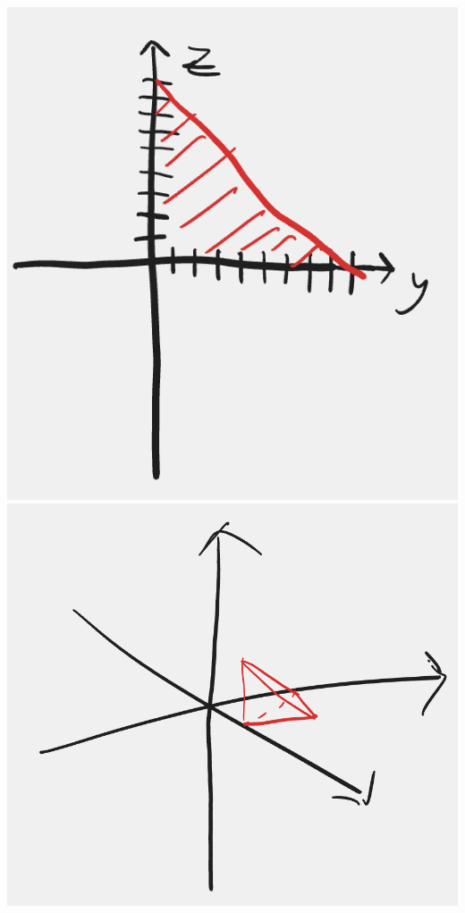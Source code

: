 \documentclass[12pt]{exam}
\begin{document}
\begin{questions}
\begin{solution}
{            \includegraphics*[scale=0.4]{images/07-yz.png}
            \includegraphics*[scale=0.5]{images/07-surface.png}
        }
        \begin{align}

\end{align}
\end{solution}
\end{questions}
\end{document}
